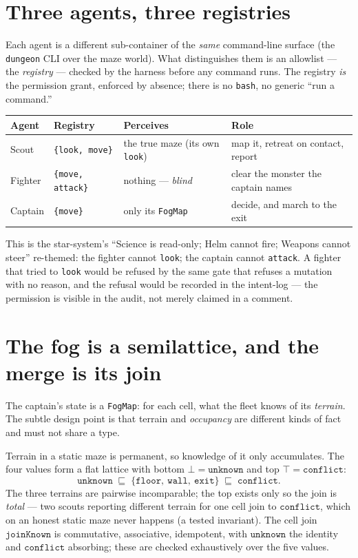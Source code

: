 \documentclass[11pt]{article}
\newcommand{\code}[1]{\texttt{#1}}
\begin{document}
\section{Three agents, three registries}

Each agent is a different sub-container of the \emph{same} command-line surface (the
\code{dungeon} CLI over the maze world). What distinguishes them is an allowlist ---
the \emph{registry} --- checked by the harness before any command runs. The registry
\emph{is} the permission grant, enforced by absence; there is no \code{bash}, no
generic ``run a command.''

\begin{center}
\begin{tabularx}{\linewidth}{@{}l l l X@{}}
\toprule
\textbf{Agent} & \textbf{Registry} & \textbf{Perceives} & \textbf{Role} \\
\midrule
Scout   & \code{\{look, move\}}   & the true maze (its own \code{look}) & map it, retreat on contact, report \\
Fighter & \code{\{move, attack\}} & nothing --- \emph{blind}            & clear the monster the captain names \\
Captain & \code{\{move\}}         & only its \code{FogMap}              & decide, and march to the exit \\
\bottomrule
\end{tabularx}
\end{center}

This is the star-system's ``Science is read-only; Helm cannot fire; Weapons cannot
steer'' re-themed: the fighter cannot \code{look}; the captain cannot \code{attack}.
A fighter that tried to \code{look} would be refused by the same gate that refuses a
mutation with no reason, and the refusal would be recorded in the intent-log --- the
permission is visible in the audit, not merely claimed in a comment.

\section{The fog is a semilattice, and the merge is its join}

The captain's state is a \code{FogMap}: for each cell, what the fleet knows of its
\emph{terrain}. The subtle design point is that terrain and \emph{occupancy} are
different kinds of fact and must not share a type.

Terrain in a static maze is permanent, so knowledge of it only accumulates. The four
values form a flat lattice with bottom $\bot = \mathtt{unknown}$ and top
$\top = \mathtt{conflict}$:
\[
  \mathtt{unknown} \;\sqsubseteq\; \{\mathtt{floor},\ \mathtt{wall},\ \mathtt{exit}\}
  \;\sqsubseteq\; \mathtt{conflict}.
\]
The three terrains are pairwise incomparable; the top exists only so the join is
\emph{total} --- two scouts reporting different terrain for one cell join to
$\mathtt{conflict}$, which on an honest static maze never happens (a tested
invariant). The cell join $\code{joinKnown}$ is commutative, associative,
idempotent, with $\mathtt{unknown}$ the identity and $\mathtt{conflict}$ absorbing;
these are checked exhaustively over the five values.
\end{document}
